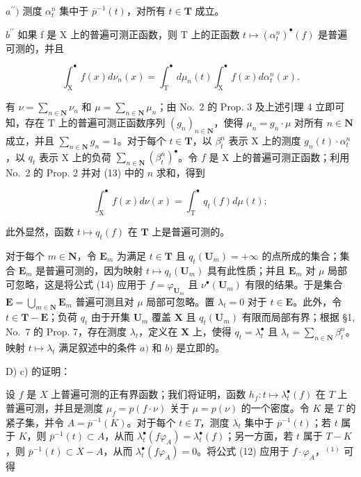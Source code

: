 \(a^{\prime \prime})\) 测度 \(\alpha_{t}^{n}\) 集中于 \(\overline{p}^{-1}(t)\)，对所有 \(t\in \mathbf{T}\) 成立。

\(b^{\prime\prime}\) 如果 f 是 X 上的普遍可测正函数，则 T 上的正函数 \(t \mapsto (\alpha_{t}^{n})^{\bullet}(f)\) 是普遍可测的，并且

\[
\int_ {\mathrm{X}} ^ {\bullet} f (x) d \nu_ {n} (x) = \int_ {\mathrm{T}} ^ {\bullet} d \mu_ {n} (t) \int_ {\mathrm{X}} ^ {\bullet} f (x) d \alpha_ {t} ^ {n} (x).\tag{13}
\]

有 \(\nu = \sum_{n\in \mathbf{N}}\nu_n\) 和 \(\mu = \sum_{n\in \mathbf{N}}\mu_n\)；由 No.~2 的 Prop. 3 及上述引理 4 立即可知，存在 T 上的普遍可测正函数序列 \((g_n)_{n\in \mathbf{N}}\)，使得 \(\mu_{n} = g_{n}\cdot \mu\) 对所有 \(n\in \mathbf{N}\) 成立，并且 \(\sum_{n\in \mathbf{N}}g_n = 1\)。对于每个 \(t\in \mathbf{T}\)，以 \(\beta_t^n\) 表示 X 上的测度 \(g_{n}(t)\cdot \alpha_{t}^{n}\)，以 \(q_{t}\) 表示 X 上的负荷 \(\sum_{n\in \mathbf{N}}(\beta_t^n)^{\bullet}\)。令 \(f\) 是 X 上的普遍可测正函数；利用 No.~2 的 Prop. 2 并对 (13) 中的 \(n\) 求和，得到

\[
\int_ {\mathrm{X}} ^ {\bullet} f (x) d \nu (x) = \int_ {\mathrm{T}} ^ {\bullet} q _ {t} (f) d \mu (t);\tag{14}
\]

此外显然，函数 \(t \mapsto q_t(f)\) 在 \(\mathbf{T}\) 上是普遍可测的。

对于每个 \(m \in \mathbf{N}\)，令 \(\mathbf{E}_m\) 为满足 \(t \in \mathbf{T}\) 且 \(q_t(\mathbf{U}_m) = +\infty\) 的点所成的集合；集合 \(\mathbf{E}_m\) 是普遍可测的，因为映射 \(t \mapsto q_t(\mathbf{U}_m)\) 具有此性质；并且 \(\mathbf{E}_m\) 对 \(\mu\) 局部可忽略，这是将公式 (14) 应用于 \(f = \varphi_{\mathbf{U}_m}\) 且 \(\nu^\bullet(\mathbf{U}_m)\) 有限的结果。于是集合 \(\mathbf{E} = \bigcup_{m \in \mathbf{N}} \mathbf{E}_m\) 普遍可测且对 \(\mu\) 局部可忽略。置 \(\lambda_t = 0\) 对于 \(t \in \mathbf{E}\)。此外，令 \(t \in \mathbf{T} - \mathbf{E}\)；负荷 \(q_t\) 由于开集 \(\mathbf{U}_m\) 覆盖 \(\mathbf{X}\) 且 \(q_t(\mathbf{U}_m)\) 有限而局部有界；根据 §1, No.~7 的 Prop. 7，存在测度 \(\lambda_t\)，定义在 \(\mathbf{X}\) 上，使得 \(q_t = \lambda_t^\bullet\) 且 \(\lambda_t = \sum_{n \in \mathbf{N}} \beta_t^n\)。映射 \(t \mapsto \lambda_t\) 满足叙述中的条件 \(a)\) 和 \(b)\) 是立即的。

D) c) 的证明：

设 \(f\) 是 \(X\) 上普遍可测的正有界函数；我们将证明，函数 \(h_f: t \mapsto \lambda_t^\bullet(f)\) 在 \(T\) 上普遍可测，并且是测度 \(\mu_f = p(f \cdot \nu)\) 关于 \(\mu = p(\nu)\) 的一个密度。令 \(K\) 是 \(T\) 的紧子集，并令 \(A = \overline{p}^{-1}(K)\)。对于每个 \(t \in T\)，测度 \(\lambda_t\) 集中于 \(\overline{p}^{-1}(t)\)；若 \(t\) 属于 \(K\)，则 \(\overline{p}^{-1}(t) \subset A\)，从而 \(\lambda_t^\bullet(f\varphi_A) = \lambda_t^\bullet(f)\)；另一方面，若 \(t\) 属于 \(T - K\)，则 \(\overline{p}^{-1}(t) \subset X - A\)，从而 \(\lambda_t^\bullet(f\varphi_A) = 0\)。将公式 (12) 应用于 \(f \cdot \varphi_A\)，\(^{(1)}\) 可得

